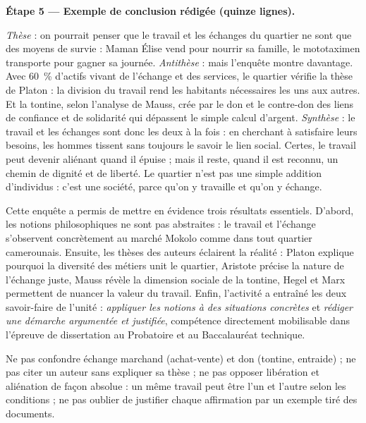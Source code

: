 \documentclass[11pt]{article}
\newcommand{\cle}[1]{{\popxbold\color{popdark}#1}}
\newcounter{popsec}
\newcounter{popsub}
\newcommand{\courssub}[1]{%
  \stepcounter{popsub}%
  \par\vspace{9pt}\noindent{\popxbold\fontsize{11.5}{13}\selectfont\color{popink}{\color{poporange}\thepopsec.\thepopsub}\hspace{6pt}#1}\par\nopagebreak\vspace{4pt}
}
\begin{document}
\begin{exoresolu}
\textbf{Étape 5 --- Exemple de conclusion rédigée (quinze lignes).}

\emph{Thèse} : on pourrait penser que le travail et les échanges du quartier ne sont que des moyens de survie : Maman Élise vend pour nourrir sa famille, le mototaximen transporte pour gagner sa journée. \emph{Antithèse} : mais l'enquête montre davantage. Avec 60 \,\% d'actifs vivant de l'échange et des services, le quartier vérifie la thèse de Platon : la division du travail rend les habitants nécessaires les uns aux autres. Et la tontine, selon l'analyse de Mauss, crée par le don et le contre-don des liens de confiance et de solidarité qui dépassent le simple calcul d'argent. \emph{Synthèse} : le travail et les échanges sont donc les deux à la fois : en cherchant à satisfaire leurs besoins, les hommes tissent sans toujours le savoir le lien social. Certes, le travail peut devenir aliénant quand il épuise ; mais il reste, quand il est reconnu, un chemin de dignité et de liberté. Le quartier n'est pas une simple addition d'individus : c'est une société, parce qu'on y travaille et qu'on y échange.
\end{exoresolu}

\courssub{Bilan de l'activité}

Cette enquête a permis de mettre en évidence trois résultats essentiels. D'abord, les notions philosophiques ne sont pas abstraites : le \cle{travail} et l'\cle{échange} s'observent concrètement au marché Mokolo comme dans tout quartier camerounais. Ensuite, les thèses des auteurs éclairent la réalité : Platon explique pourquoi la diversité des métiers unit le quartier, Aristote précise la nature de l'échange juste, Mauss révèle la dimension sociale de la tontine, Hegel et Marx permettent de nuancer la valeur du travail. Enfin, l'activité a entraîné les deux savoir-faire de l'unité : \emph{appliquer les notions à des situations concrètes} et \emph{rédiger une démarche argumentée et justifiée}, compétence directement mobilisable dans l'épreuve de dissertation au Probatoire et au Baccalauréat technique.

\begin{attention}
Ne pas confondre échange marchand (achat-vente) et don (tontine, entraide) ; ne pas citer un auteur sans expliquer sa thèse ; ne pas opposer libération et aliénation de façon absolue : un même travail peut être l'un et l'autre selon les conditions ; ne pas oublier de justifier chaque affirmation par un exemple tiré des documents.
\end{attention}
\end{document}
